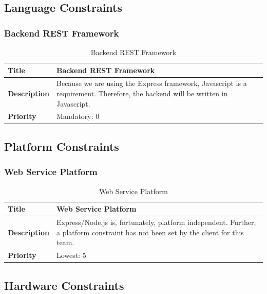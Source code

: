 \documentclass{article}
\begin{document}
\subsection{Language Constraints}

\subsubsection{Backend REST Framework}

\begin{table}[H]
	\caption{Backend REST Framework}
	\begin{tabularx}{\textwidth}{|l|X|}
		\hline
		\textbf{Title}       & Backend REST Framework                      \\ \hline
		\textbf{Description} & Because we are using the Express framework,
		Javascript is a requirement. Therefore, the backend will be written
		in Javascript. \\ \hline
		\textbf{Priority}    & Mandatory: 0                                \\ \hline
	\end{tabularx}
\end{table}

\subsection{Platform Constraints}

\subsubsection{Web Service Platform}

\begin{table}[H]
	\caption{Web Service Platform}
	\begin{tabularx}{\textwidth}{|l|X|}
		\hline
		\textbf{Title}       & Web Service Platform                      \\ \hline
		\textbf{Description} & Express/Node.js is, fortunately, platform
		independent. Further, a platform constraint has not been set by the
		client for this team.       \\ \hline
		\textbf{Priority}    & Lowest: 5                                 \\ \hline
	\end{tabularx}
\end{table}

\subsection{Hardware Constraints}
\end{document}
